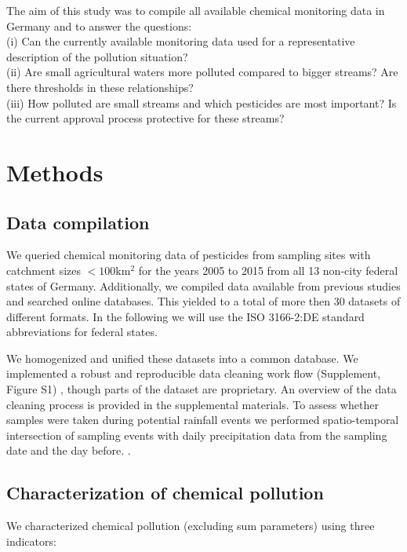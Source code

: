 \documentclass[journal=esthag,manuscript=article]{achemso}
\begin{document}
The aim of this study was to compile all available chemical monitoring data in Germany and to answer the questions: \\
(i) Can the currently available monitoring data used for a representative description of the pollution situation? \\
(ii) Are small agricultural waters more polluted compared to bigger streams? Are there thresholds in these relationships? \\
(iii) How polluted are small streams and which pesticides are most important? Is the current approval process protective for these streams?  


\section{Methods}
\subsection{Data compilation}

We queried chemical monitoring data of pesticides from sampling sites with catchment sizes $\mathrm{< 100km^2}$ for the years 2005 to 2015 from all 13 non-city federal states of Germany.
Additionally, we compiled data available from previous studies and searched online databases.
This yielded to a total of more then 30 datasets of different formats.
In the following we will use the ISO 3166-2:DE standard abbreviations for federal states.

We homogenized and unified these datasets into a common database.
We implemented a robust and reproducible data cleaning work flow (Supplement, Figure S1) \citep{poisot_best_2015}, though parts of the dataset are proprietary.
An overview of the data cleaning process is provided in the supplemental materials.  
To assess whether samples were taken during potential rainfall events we performed spatio-temporal intersection of sampling events with daily precipitation data from the sampling date and the day before. \citep{rauthe_central_2013}.

\subsection{Characterization of chemical pollution}
We characterized chemical pollution (excluding sum parameters) using three indicators:
\end{document}
